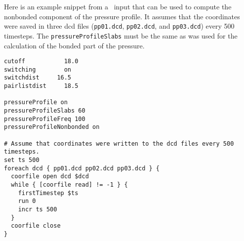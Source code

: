 Here is an example snippet from a \NAMD\ input that can be used to compute
the nonbonded component of the pressure profile.  It assumes that the 
coordinates were saved in three dcd files ({\tt pp01.dcd}, {\tt pp02.dcd},
and {\tt pp03.dcd}) every 500 timesteps.  The {\tt pressureProfileSlabs}
must be the same as was used for the calculation of the bonded part of
the pressure.
\begin{verbatim}
cutoff		     18.0
switching	     on
switchdist	   16.5	
pairlistdist	 18.5 

pressureProfile	on
pressureProfileSlabs 60 
pressureProfileFreq 100 
pressureProfileNonbonded on

# Assume that coordinates were written to the dcd files every 500 timesteps.
set ts 500
foreach dcd { pp01.dcd pp02.dcd pp03.dcd } {
  coorfile open dcd $dcd
  while { [coorfile read] != -1 } {
    firstTimestep $ts 
    run 0 
    incr ts 500
  }
  coorfile close
}
\end{verbatim}

